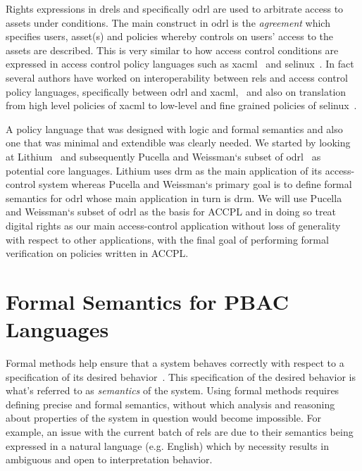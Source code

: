 Rights expressions in \ac{drel}s and specifically \ac{odrl} are used to arbitrate access to assets under conditions. The main construct in \ac{odrl} is the \emph{agreement} which specifies users, asset(s) and policies whereby controls on users' access to the assets are described. This is very similar to how access control conditions are expressed in access control policy languages such as \ac{xacml}~\cite{xacml} and \ac{selinux}~\cite{selinux}. In fact several authors have worked on interoperability between \ac{rel}s and access control policy languages, specifically between \ac{odrl} and \ac{xacml},~\cite{prados2005interoperability, maronas2009architecture} and also on translation from high level policies of \ac{xacml} to low-level and fine grained policies of \ac{selinux}~\cite{alam2008usage}. 

A policy language that was designed with logic and formal semantics and also one that was minimal and extendible was clearly needed. We started by looking at Lithium~\cite{Halpern2008} and subsequently Pucella and Weissman`s subset of \ac{odrl}~\cite{pucella2006} as potential core languages. Lithium uses \ac{drm} as the main application of its access-control system whereas Pucella and Weissman`s primary goal is to define formal semantics for \ac{odrl} whose main application in turn is \ac{drm}. We will use Pucella and Weissman`s subset of \ac{odrl} as the basis for \ac{ACCPL} and in doing so treat digital rights as our main access-control application without loss of generality with respect to other applications, with the final goal of performing formal verification on policies written in \ac{ACCPL}.



\section{Formal Semantics for PBAC Languages}


Formal methods help ensure that a system behaves correctly with respect to a specification of its desired behavior~\cite{TAPL}. This specification of the desired behavior is what's referred to as \emph{semantics} of the system. Using formal methods requires defining precise and formal semantics, without which analysis and reasoning about properties of the system in question would become impossible. For example, an issue with the current batch of \ac{rel}s are due to their semantics being expressed in a natural language (e.g. English) which by necessity results in ambiguous and open to interpretation behavior. 

